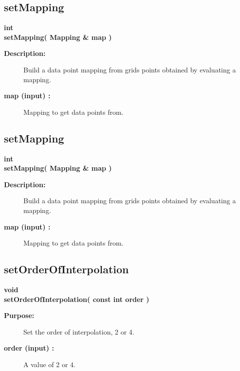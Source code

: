 \subsection{setMapping}
 
\begin{flushleft} \textbf{%
int  \\ 
\settowidth{\DataPointMappingIncludeArgIndent}{setMapping(}%
setMapping( Mapping \& map )             
}\end{flushleft}
\begin{description}
\item[{\bf Description:}] 
    Build a data point mapping from grids points obtained by evaluating a 
  mapping. 
\item[{\bf map (input) :}]  Mapping to get data points from.
 
\end{description}
\subsection{setMapping}
 
\begin{flushleft} \textbf{%
int  \\ 
\settowidth{\DataPointMappingIncludeArgIndent}{setMapping(}%
setMapping( Mapping \& map )             
}\end{flushleft}
\begin{description}
\item[{\bf Description:}] 
    Build a data point mapping from grids points obtained by evaluating a 
  mapping. 
\item[{\bf map (input) :}]  Mapping to get data points from.
 
\end{description}
\subsection{setOrderOfInterpolation}
 
\begin{flushleft} \textbf{%
void  \\ 
\settowidth{\DataPointMappingIncludeArgIndent}{setOrderOfInterpolation(}%
setOrderOfInterpolation( const int order )
}\end{flushleft}
\begin{description}
\item[{\bf Purpose:}]  
   Set the order of interpolation, 2 or 4.
\item[{\bf order (input) :}]  A value of 2 or 4.
\end{description}
